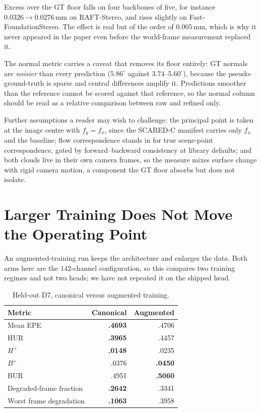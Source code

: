 \documentclass[letterpaper,10pt,conference]{ieeeconf}
\begin{document}
Excess over the GT floor falls on four backbones of five, for instance
$0.0326 \rightarrow 0.0276$\,mm on RAFT-Stereo, and rises slightly on
Fast-FoundationStereo. The effect is real but of the order of
$0.005$\,mm, which is why it never appeared in the paper even before the
world-frame measurement replaced it.

The normal metric carries a caveat that removes its floor entirely: GT
normals are \emph{noisier} than every prediction ($5.86^\circ$ against
$3.74$--$5.60^\circ$), because the pseudo-ground-truth is sparse and
central differences amplify it. Predictions smoother than the reference
cannot be scored against that reference, so the normal column should be
read as a relative comparison between raw and refined only.

Further assumptions a reader may wish to challenge: the principal point
is taken at the image centre with $f_y=f_x$, since the SCARED-C manifest
carries only $f_x$ and the baseline; flow correspondence stands in for
true scene-point correspondence, gated by forward--backward consistency
at library defaults; and both clouds live in their own camera frames, so
the measure mixes surface change with rigid camera motion, a component
the GT floor absorbs but does not isolate.

\section{Larger Training Does Not Move the Operating Point}

An augmented-training run keeps the architecture and enlarges the data. Both
arms here are the $142$-channel configuration, so this compares two training
regimes and not two heads; we have not repeated it on the shipped head.

\begin{table}[htb]
\centering
\small
\caption{Held-out D7, canonical versus augmented training.}
\label{sup:augmented}
\begin{tabular}{lrr}
\toprule
Metric & Canonical & Augmented \\
\midrule
Mean EPE & \textbf{.4693} & .4706 \\
HUR & \textbf{.3965} & .4457 \\
$H^{+}$ & \textbf{.0148} & .0235 \\
$B^{+}$ & .0376 & \textbf{.0450} \\
BUR & .4951 & \textbf{.5060} \\
Degraded-frame fraction & \textbf{.2642} & .3341 \\
Worst frame degradation & \textbf{.1063} & .3958 \\
\bottomrule
\end{tabular}
\end{table}
\end{document}
